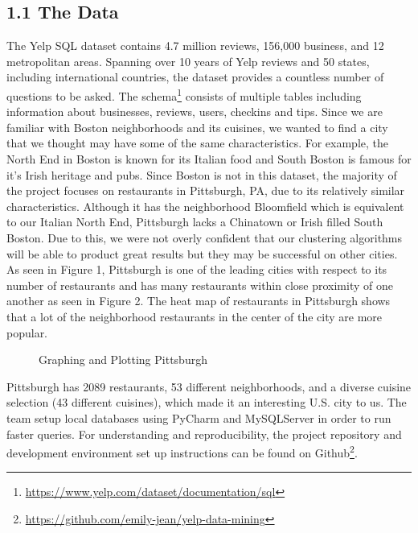 \documentclass{neu_handout}
\begin{document}
\subsection*{1.1 The Data}
The Yelp SQL dataset contains 4.7 million reviews, 156,000 business, and 12 metropolitan areas. Spanning over 10 years of Yelp reviews and 50 states, including international countries, the dataset provides a countless number of questions to be asked. The schema\footnote{\url{https://www.yelp.com/dataset/documentation/sql}} consists of multiple tables including information about businesses, reviews, users, checkins and tips. Since we are familiar with Boston neighborhoods and its cuisines, we wanted to find a city that we thought may have some of the same characteristics. For example, the North End in Boston is known for its Italian food and South Boston is famous for it's Irish heritage and pubs. Since Boston is not in this dataset, the majority of the project focuses on restaurants in Pittsburgh, PA, due to its relatively similar characteristics. Although it has the neighborhood Bloomfield which is equivalent to our Italian North End, Pittsburgh lacks a Chinatown or Irish filled South Boston. Due to this, we were not overly confident that our clustering algorithms will be able to product great results but they may be successful on other cities.
As seen in Figure 1, Pittsburgh is one of the leading cities with respect to its number of restaurants and has many restaurants within close proximity of one another as seen in Figure 2. The heat map of restaurants in Pittsburgh shows that a lot of the neighborhood restaurants in the center of the city are more popular.
\begin{figure}[h]
\centering
{}
\caption{Graphing and Plotting Pittsburgh}
\end{figure}
Pittsburgh has 2089 restaurants, 53 different neighborhoods, and a diverse cuisine selection (43 different cuisines), which made it an interesting U.S. city to us.
The team setup local databases using PyCharm and MySQLServer in order to run faster queries. For understanding and reproducibility, the project repository and development environment set up instructions can be found on Github\footnote{\url{https://github.com/emily-jean/yelp-data-mining}}.
\end{document}
